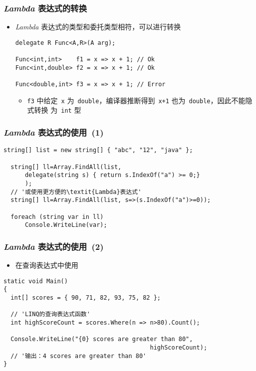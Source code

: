 \begin{frame}[fragile]
\frametitle{\textit{Lambda} 表达式的转换}
\begin{itemize}
\item \textit{Lambda} 表达式的类型和委托类型相符，可以进行转换
\begin{lstlisting}
delegate R Func<A,R>(A arg);

Func<int,int>    f1 = x => x + 1; // Ok
Func<int,double> f2 = x => x + 1; // Ok

Func<double,int> f3 = x => x + 1; // Error
\end{lstlisting}
\begin{itemize}
\item \texttt{f3} 中给定~\texttt{x} 为~\texttt{double}，编译器推断得到~\texttt{x+1} 也为~\texttt{double}，因此不能隐式转换
  为~\texttt{int} 型
\end{itemize}
\end{itemize}
\end{frame}

\begin{frame}[fragile]
\frametitle{\textit{Lambda} 表达式的使用~(1)}
\begin{lstlisting}[escapeinside='']
  string[] list = new string[] { "abc", "12", "java" };

  string[] ll=Array.FindAll(list,
      delegate(string s) { return s.IndexOf("a") >= 0;}
      );
  // '或使用更方便的\textit{Lambda}表达式'
  string[] ll=Array.FindAll(list, s=>(s.IndexOf("a")>=0));

  foreach (string var in ll)
      Console.WriteLine(var);
\end{lstlisting}
\end{frame}

\begin{frame}[fragile]
\frametitle{\textit{Lambda} 表达式的使用~(2)}
\begin{itemize}
\item 在查询表达式中使用
\end{itemize}
\begin{lstlisting}[escapeinside='']
static void Main()
{
  int[] scores = { 90, 71, 82, 93, 75, 82 };

  // 'LINQ的查询表达式函数'
  int highScoreCount = scores.Where(n => n>80).Count();

  Console.WriteLine("{0} scores are greater than 80",
                                         highScoreCount);
  // '输出：4 scores are greater than 80'
}
\end{lstlisting}
\end{frame}

